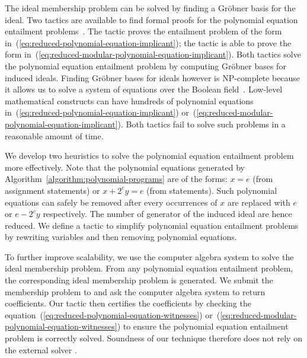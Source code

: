 The ideal membership problem can be solved by finding a Gr\"obner
basis for the ideal. Two \coq tactics are available to
find formal proofs for the polynomial equation entailment
problems~\cite{P:08:CGBP,P:10:CGBP}. 
The tactic  proves the entailment problem of
the form in~(\ref{eq:reduced-polynomial-equation-implicant}); the
tactic  is able to prove the form
in~(\ref{eq:reduced-modular-polynomial-equation-implicant}). 
Both tactics solve the polynomial equation entailment problem by
computing Gr\"obner bases for induced ideals. Finding Gr\"obner bases
for ideals however is NP-complete because it allows us to solve a
system of equations over the Boolean field~\cite{GJ:1979:CAI}. 
Low-level mathematical constructs can have
hundreds of polynomial equations 
in~(\ref{eq:reduced-polynomial-equation-implicant})
or~(\ref{eq:reduced-modular-polynomial-equation-implicant}). 
Both \coq tactics fail to solve such problems in a reasonable
amount of time. 

We develop two heuristics to solve the polynomial equation
entailment problem more effectively. Note that the polynomial equations
generated by Algorithm~\ref{algorithm:polynomial-programs} are of the  
forms: $x = e$ (from assignment statements) or $x + 2^c y
= e$ (from  statements). Such polynomial equations can
safely be removed after every occurrences of $x$ are replaced with $e$
or $e - 2^c y$ respectively. The number of generator of the induced
ideal are hence reduced. We define a \coq
tactic to simplify polynomial equation entailment problems by 
rewriting variables and then removing polynomial equations.

To further improve scalability, we use the computer algebra system
\singular to solve the ideal membership problem. From any polynomial
equation entailment problem, the corresponding ideal membership
problem is generated. We submit the membership problem to \singular and
ask the computer algebra system to return coefficients. Our \coq
tactic then certifies the coefficients by checking the
equation~(\ref{eq:reduced-polynomial-equation-witnesses})
or~(\ref{eq:reduced-modular-polynomial-equation-witnesses}) to ensure
the polynomial equation entailment problem is correctly
solved. Soundness of our technique therefore does not rely on the
external solver \singular.

